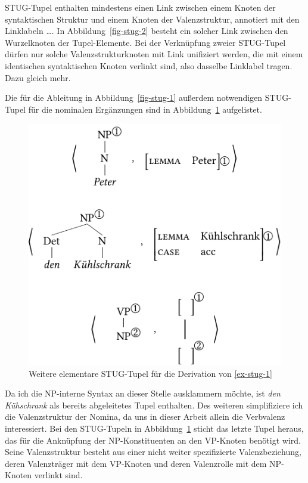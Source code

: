 STUG-Tupel enthalten mindestens einen Link zwischen einem Knoten der syntaktischen Struktur und einem Knoten der Valenzstruktur, annotiert mit den Linklabeln  \ldots {}. In Abbildung~\ref{fig-stug-2} besteht ein solcher Link zwischen den Wurzelknoten der Tupel-Elemente. Bei der Verknüpfung zweier STUG-Tupel dürfen nur solche Valenzstrukturknoten mit Link unifiziert werden, die mit einem identischen syntaktischen Knoten verlinkt sind, also dasselbe Linklabel tragen. Dazu gleich mehr. 

Die für die Ableitung in Abbildung~\ref{fig-stug-1} au\ss erdem notwendigen STUG-Tupel für die nominalen Ergänzungen sind in Abbildung~\ref{fig-stug-3} aufgelistet.
\begin{figure}[t]
\centering
\includegraphics{graphics/abb93.pdf}
\caption{\label{fig-stug-3}Weitere elementare STUG-Tupel für die Derivation von \ref{ex-stug-1}}
\end{figure}
Da ich die NP-interne Syntax an dieser Stelle ausklammern möchte, ist {\it den Kühschrank} als bereits abgeleitetes Tupel enthalten. Des weiteren simplifiziere ich die Valenzstruktur der Nomina, da uns in dieser Arbeit allein die Verbvalenz interessiert. Bei den STUG-Tupeln in Abbildung~\ref{fig-stug-3} sticht das letzte Tupel heraus, das für die Anknüpfung der NP-Konstituenten an den VP-Knoten benötigt wird. Seine Valenzstruktur besteht aus einer nicht weiter spezifizierte Valenzbeziehung, deren Valenzträger mit dem VP-Knoten und deren Valenzrolle mit dem NP-Knoten verlinkt sind.

